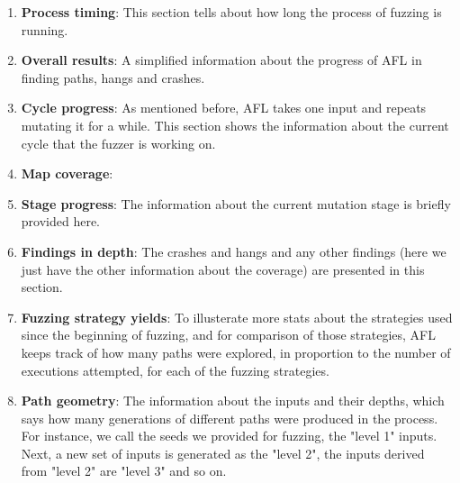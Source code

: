 \begin{enumerate}
    
    \begin{enumerate}
        \item \textbf{Process timing}: This section tells about how long the process of fuzzing is running.
        \item \textbf{Overall results}: A simplified information about the progress of AFL in finding paths, hangs and crashes. 
        \item \textbf{Cycle progress}: As mentioned before, AFL takes one input and repeats mutating it for a while. This section shows the information about the current cycle that the fuzzer is working on.
        \item \textbf{Map coverage}: 
        \item \textbf{Stage progress}: The information about the current mutation stage is briefly provided here.
        \item \textbf{Findings in depth}: The crashes and hangs and any other findings (here we just have the other information about the coverage) are presented in this section.
        \item \textbf{Fuzzing strategy yields}: To illusterate more stats about the strategies used since the beginning of fuzzing, and for comparison of those strategies, AFL keeps track of how many paths were explored, in proportion to the number of executions attempted, for each of the fuzzing strategies.
        \item \textbf{Path geometry}: The information about the inputs and their depths, which says how many generations of different paths were produced in the process. For instance, we call the seeds we provided for fuzzing, the "level 1" inputs. Next, a new set of inputs is generated as the "level 2", the inputs derived from "level 2" are "level 3" and so on.
    \end{enumerate}


\end{enumerate}
